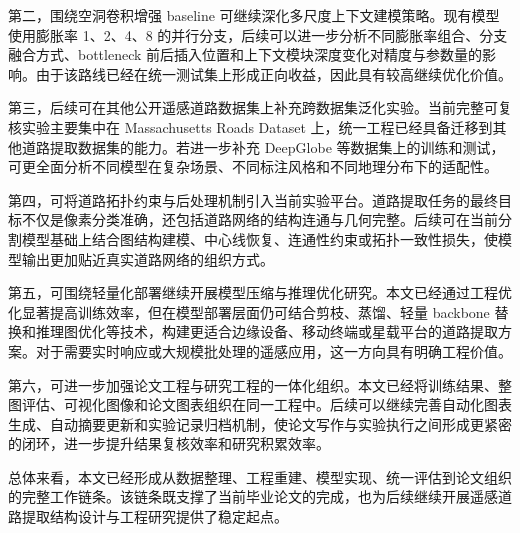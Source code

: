 第二，围绕空洞卷积增强 baseline 可继续深化多尺度上下文建模策略。现有模型使用膨胀率 1、2、4、8 的并行分支，后续可以进一步分析不同膨胀率组合、分支融合方式、bottleneck 前后插入位置和上下文模块深度变化对精度与参数量的影响。由于该路线已经在统一测试集上形成正向收益，因此具有较高继续优化价值。

第三，后续可在其他公开遥感道路数据集上补充跨数据集泛化实验。当前完整可复核实验主要集中在 Massachusetts Roads Dataset 上，统一工程已经具备迁移到其他道路提取数据集的能力。若进一步补充 DeepGlobe 等数据集上的训练和测试，可更全面分析不同模型在复杂场景、不同标注风格和不同地理分布下的适配性。

第四，可将道路拓扑约束与后处理机制引入当前实验平台。道路提取任务的最终目标不仅是像素分类准确，还包括道路网络的结构连通与几何完整。后续可在当前分割模型基础上结合图结构建模、中心线恢复、连通性约束或拓扑一致性损失，使模型输出更加贴近真实道路网络的组织方式。

第五，可围绕轻量化部署继续开展模型压缩与推理优化研究。本文已经通过工程优化显著提高训练效率，但在模型部署层面仍可结合剪枝、蒸馏、轻量 backbone 替换和推理图优化等技术，构建更适合边缘设备、移动终端或星载平台的道路提取方案。对于需要实时响应或大规模批处理的遥感应用，这一方向具有明确工程价值。

第六，可进一步加强论文工程与研究工程的一体化组织。本文已经将训练结果、整图评估、可视化图像和论文图表组织在同一工程中。后续可以继续完善自动化图表生成、自动摘要更新和实验记录归档机制，使论文写作与实验执行之间形成更紧密的闭环，进一步提升结果复核效率和研究积累效率。

总体来看，本文已经形成从数据整理、工程重建、模型实现、统一评估到论文组织的完整工作链条。该链条既支撑了当前毕业论文的完成，也为后续继续开展遥感道路提取结构设计与工程研究提供了稳定起点。
